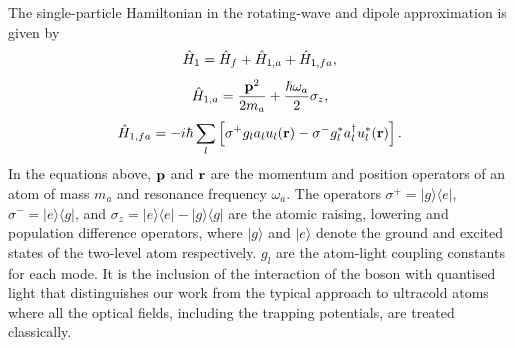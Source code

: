 The single-particle Hamiltonian in the rotating-wave and dipole
approximation is given by
\begin{equation}
  \hat{H}_1 = \hat{H}_f + \hat{H}_{1,a} + \hat{H}_{1,fa},
\end{equation}
\begin{equation}
  \hat{H}_{1,a} = \frac{\mathbf{p}^2} {2 m_a} + \frac{\hbar \omega_a}{2} \sigma_z,
\end{equation}
\begin{equation}
  \hat{H}_{1,fa} =  - i \hbar \sum_l \left[ \sigma^+ g_l a_l u_l(\mathbf{r}) - \sigma^- g^*_l
    a^\dagger_l u^*_l(\mathbf{r}) \right].
\end{equation}
In the equations above, $\mathbf{p}$ and $\mathbf{r}$ are the momentum and
position operators of an atom of mass $m_a$ and resonance frequency
$\omega_a$. The operators $\sigma^+ = |g \rangle \langle e|$,
$\sigma^- = |e \rangle \langle g|$, and
$\sigma_z = |e \rangle \langle e| - |g \rangle \langle g|$ are the
atomic raising, lowering and population difference operators, where
$|g \rangle$ and $| e \rangle$ denote the ground and excited states of
the two-level atom respectively. $g_l$ are the atom-light coupling
constants for each mode. It is the inclusion of the interaction of the
boson with quantised light that distinguishes our work from the
typical approach to ultracold atoms where all the optical fields,
including the trapping potentials, are treated classically.

